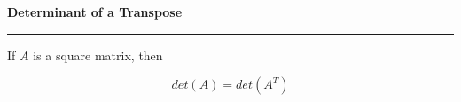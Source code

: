 \nopagenumbers
{\bf Determinant of a Transpose}
\vskip 1mm
\hrule

\vskip 6pt
If $A$ is a square matrix, then

$$det(A)=det(A^T)$$

\vfill\eject
\bye
